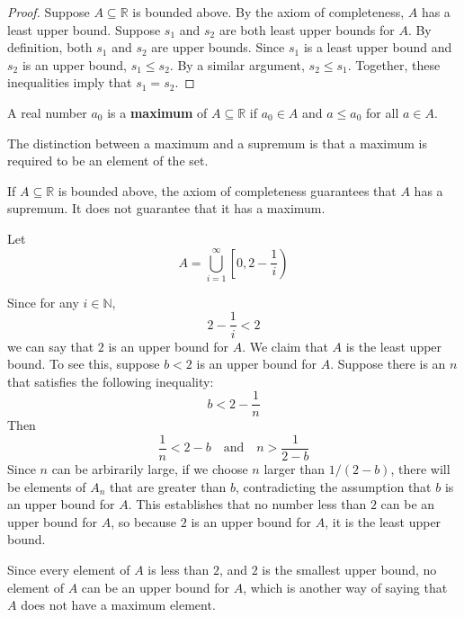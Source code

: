 \begin{proof} Suppose $A\subseteq\mathbb{R}$ is bounded above.  By the axiom of completeness, $A$ has a least upper bound.  Suppose $s_1$ and $s_2$ are both least upper bounds for $A$.  By definition, both $s_1$ and $s_2$ are upper bounds.  Since $s_1$ is a least upper bound and $s_2$ is an upper bound, $s_1\leq s_2$.  By a similar argument, $s_2\leq s_1$.  Together, these inequalities imply that $s_1=s_2$.  
\end{proof}
\par\vspace{0.3 cm}
\begin{definition}[maximum] A real number $a_0$ is a \textbf{maximum} of $A\subseteq\mathbb{R}$ if $a_0\in A$ and $a\leq a_0$ for all $a\in A$.
\end{definition}
\par\vspace{0.3 cm}
The distinction between a maximum and a supremum is that a maximum is required to be an element of the set.
\par\vspace{0.3 cm}
If $A\subseteq\mathbb{R}$ is bounded above, the axiom of completeness guarantees that $A$ has a supremum.  It does not guarantee that it has a maximum.
\par\vspace{0.3 cm}
\begin{example}
Let
\[
A = \bigcup_{i=1}^\infty \left[0,2-\frac{1}{i}\right)
\]
\par\vspace{0.3 cm}
Since for any $i\in\mathbb{N}$,
\[
2-\frac{1}{i} < 2
\]
we can say that $2$ is an upper bound for $A$.  We claim that $A$ is the least upper bound.  To see this, suppose $b<2$ is an upper bound for $A$.  Suppose there is an $n$ that satisfies the following inequality:
\[
b < 2-\frac{1}{n}
\]
Then
\[
\frac{1}{n} < 2-b \quad\mbox{and}\quad n > \frac{1}{2-b}
\]
Since $n$ can be arbirarily large, if we choose $n$ larger than $1/(2-b)$, there will be elements of $A_n$ that are greater than $b$, contradicting the assumption that $b$ is an upper bound for $A$.  This establishes that no number less than $2$ can be an upper bound for $A$, so because $2$ is an upper bound for $A$, it is the least upper bound.
\par\vspace{0.3 cm}
Since every element of $A$ is less than $2$, and $2$ is the smallest upper bound, no element of $A$ can be an upper bound for $A$, which is another way of saying that $A$ does not have a maximum element.
\end{example}
